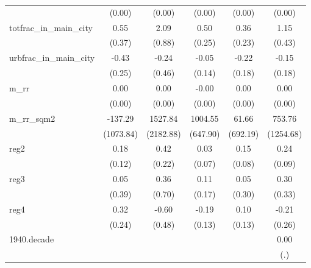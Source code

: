 {\begin{tabular}{l*{5}{c}}
          &   (0.00)         &   (0.00)         &   (0.00)         &   (0.00)         &   (0.00)         \\
\addlinespace
totfrac\_in\_main\_city&     0.55         &     2.09\sym{*}  &     0.50\sym{*}  &     0.36         &     1.15\sym{**} \\
          &   (0.37)         &   (0.88)         &   (0.25)         &   (0.23)         &   (0.43)         \\
\addlinespace
urbfrac\_in\_main\_city&    -0.43         &    -0.24         &    -0.05         &    -0.22         &    -0.15         \\
          &   (0.25)         &   (0.46)         &   (0.14)         &   (0.18)         &   (0.18)         \\
\addlinespace
m\_rr      &     0.00\sym{**} &     0.00         &    -0.00         &     0.00\sym{**} &     0.00         \\
          &   (0.00)         &   (0.00)         &   (0.00)         &   (0.00)         &   (0.00)         \\
\addlinespace
m\_rr\_sqm2 &  -137.29         &  1527.84         &  1004.55         &    61.66         &   753.76         \\
          &(1073.84)         &(2182.88)         & (647.90)         & (692.19)         &(1254.68)         \\
\addlinespace
reg2      &     0.18         &     0.42         &     0.03         &     0.15         &     0.24\sym{**} \\
          &   (0.12)         &   (0.22)         &   (0.07)         &   (0.08)         &   (0.09)         \\
\addlinespace
reg3      &     0.05         &     0.36         &     0.11         &     0.05         &     0.30         \\
          &   (0.39)         &   (0.70)         &   (0.17)         &   (0.30)         &   (0.33)         \\
\addlinespace
reg4      &     0.32         &    -0.60         &    -0.19         &     0.10         &    -0.21         \\
          &   (0.24)         &   (0.48)         &   (0.13)         &   (0.13)         &   (0.26)         \\
\addlinespace
1940.decade&                  &                  &                  &                  &     0.00         \\
          &                  &                  &                  &                  &      (.)         \\

\end{tabular}}
